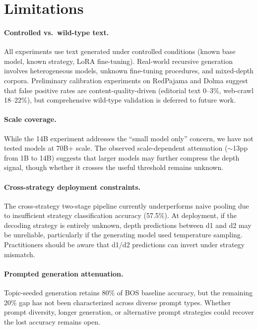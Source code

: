 \documentclass[11pt,a4paper]{article}
\begin{document}
\section{Limitations}

\paragraph{Controlled vs.\ wild-type text.}
All experiments use text generated under controlled conditions (known base model, known strategy, LoRA fine-tuning). Real-world recursive generation involves heterogeneous models, unknown fine-tuning procedures, and mixed-depth corpora. Preliminary calibration experiments on RedPajama and Dolma suggest that false positive rates are content-quality-driven (editorial text 0--3\%, web-crawl 18--22\%), but comprehensive wild-type validation is deferred to future work.

\paragraph{Scale coverage.}
While the 14B experiment addresses the ``small model only'' concern, we have not tested models at 70B+ scale. The observed scale-dependent attenuation ($\sim$13pp from 1B to 14B) suggests that larger models may further compress the depth signal, though whether it crosses the useful threshold remains unknown.

\paragraph{Cross-strategy deployment constraints.}
The cross-strategy two-stage pipeline currently underperforms naive pooling due to insufficient strategy classification accuracy (57.5\%). At deployment, if the decoding strategy is entirely unknown, depth predictions between d1 and d2 may be unreliable, particularly if the generating model used temperature sampling. Practitioners should be aware that d1/d2 predictions can invert under strategy mismatch.

\paragraph{Prompted generation attenuation.}
Topic-seeded generation retains 80\% of BOS baseline accuracy, but the remaining 20\% gap has not been characterized across diverse prompt types. Whether prompt diversity, longer generation, or alternative prompt strategies could recover the lost accuracy remains open.
\end{document}
